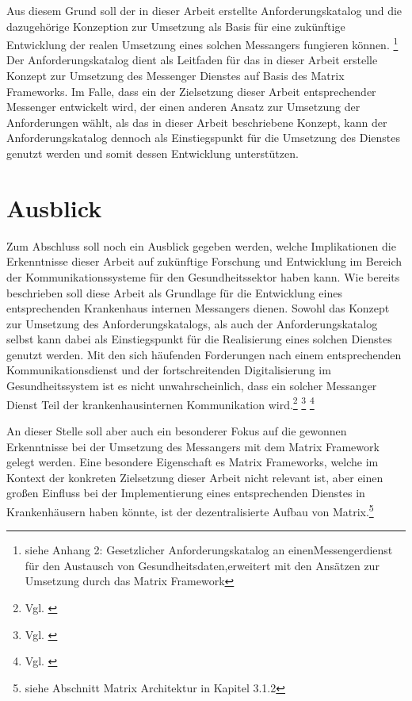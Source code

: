 Aus diesem Grund soll der in dieser Arbeit erstellte Anforderungskatalog und die dazugehörige Konzeption zur Umsetzung als Basis für eine zukünftige Entwicklung der realen Umsetzung eines solchen Messangers fungieren können. \footnote{siehe Anhang 2: Gesetzlicher Anforderungskatalog an einenMessengerdienst für den Austausch von Gesundheitsdaten,erweitert mit den Ansätzen zur Umsetzung durch das Matrix Framework} 
Der Anforderungskatalog dient als Leitfaden für das in dieser Arbeit erstelle Konzept zur Umsetzung des Messenger Dienstes auf Basis des Matrix Frameworks. Im Falle, dass ein der Zielsetzung dieser Arbeit entsprechender Messenger entwickelt wird, der einen anderen Ansatz zur Umsetzung der Anforderungen wählt, als das in dieser Arbeit beschriebene Konzept, kann der Anforderungskatalog dennoch als Einstiegspunkt für die Umsetzung des Dienstes genutzt werden und somit dessen Entwicklung unterstützen.

\section{Ausblick}\label{chapter:fazit}
Zum Abschluss soll noch ein Ausblick gegeben werden, welche Implikationen die Erkenntnisse dieser Arbeit auf zukünftige Forschung und Entwicklung im Bereich der Kommunikationssysteme für den Gesundheitssektor haben kann. Wie bereits beschrieben soll diese Arbeit als Grundlage für die Entwicklung eines entsprechenden Krankenhaus internen Messangers dienen. Sowohl das Konzept zur Umsetzung des Anforderungskatalogs, als auch der Anforderungskatalog selbst kann dabei als Einstiegspunkt für die Realisierung eines solchen Dienstes genutzt werden. Mit den sich häufenden Forderungen nach einem entsprechenden Kommunikationsdienst und der fortschreitenden Digitalisierung im Gesundheitssystem ist es nicht unwahrscheinlich, dass ein solcher Messanger Dienst Teil der krankenhausinternen Kommunikation wird.\footnote{Vgl. \cite[S. 2]{Bundesaerztekammer2020}} \footnote{Vgl. \cite{Giesselmann2018}} \footnote{Vgl. \cite[S. 1 ff.]{Datenschutzkonferenz2019}}

An dieser Stelle soll aber auch ein besonderer Fokus auf die gewonnen Erkenntnisse bei der Umsetzung des Messangers mit dem Matrix Framework gelegt werden. Eine besondere Eigenschaft es Matrix Frameworks, welche im Kontext der konkreten Zielsetzung dieser Arbeit nicht relevant ist, aber einen großen Einfluss bei der Implementierung eines entsprechenden Dienstes in Krankenhäusern haben könnte, ist der dezentralisierte Aufbau von Matrix.\footnote{siehe Abschnitt Matrix Architektur in Kapitel 3.1.2}


